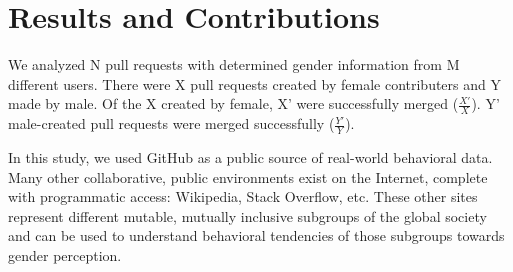 \documentclass{sigplanconf}
\begin{document}
\section{Results and Contributions}
We analyzed N pull requests with determined gender information from M different
users. There were X pull requests created by female contributers and Y made by
male. Of the X created by female, X' were successfully merged ($\frac{X'}{X}$). Y' male-created pull requests
were merged successfully ($\frac{Y'}{Y}$).

In this study, we used GitHub as a public source of real-world behavioral data.
Many other collaborative, public environments exist on the Internet, complete
with programmatic access: Wikipedia, Stack Overflow, etc. These other sites
represent different mutable, mutually inclusive subgroups of the global
society and can be used to understand behavioral tendencies of those subgroups
towards gender perception.


\acks




\renewcommand{\bibfont}{\normalsize}


\begin{thebibliography}
\softraggedright


\end{thebibliography}
\end{document}
